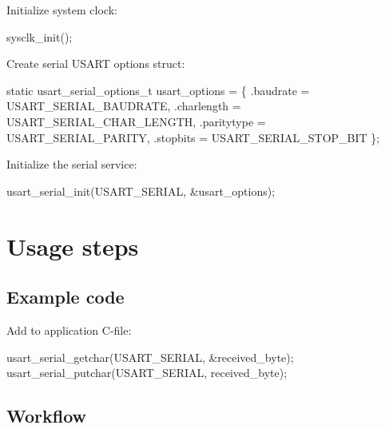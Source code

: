 \begin{DoxyEnumerate}
\item Initialize system clock\+:
\begin{DoxyItemize}
\item 
\begin{DoxyCode}
sysclk\_init(); 
\end{DoxyCode}

\end{DoxyItemize}
\item Create serial U\+S\+A\+R\+T options struct\+:
\begin{DoxyItemize}
\item 
\begin{DoxyCode}
\textcolor{keyword}{static} usart\_serial\_options\_t usart\_options = \{
   .baudrate = USART\_SERIAL\_BAUDRATE,
   .charlength = USART\_SERIAL\_CHAR\_LENGTH,
   .paritytype = USART\_SERIAL\_PARITY,
   .stopbits = USART\_SERIAL\_STOP\_BIT
\};
\end{DoxyCode}

\end{DoxyItemize}
\item Initialize the serial service\+:
\begin{DoxyItemize}
\item 
\begin{DoxyCode}
usart\_serial\_init(USART\_SERIAL, &usart\_options);
\end{DoxyCode}

\end{DoxyItemize}
\end{DoxyEnumerate}\hypertarget{serial_quickstart_serial_basic_use_case_usage}{}\section{Usage steps}\label{serial_quickstart_serial_basic_use_case_usage}
\hypertarget{serial_quickstart_serial_basic_use_case_usage_code}{}\subsection{Example code}\label{serial_quickstart_serial_basic_use_case_usage_code}
Add to application C-\/file\+: 
\begin{DoxyCode}
usart\_serial\_getchar(USART\_SERIAL, &received\_byte);
usart\_serial\_putchar(USART\_SERIAL, received\_byte);
\end{DoxyCode}
\hypertarget{serial_quickstart_serial_basic_use_case_usage_flow}{}\subsection{Workflow}\label{serial_quickstart_serial_basic_use_case_usage_flow}


